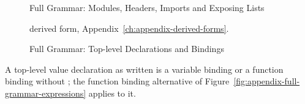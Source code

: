 \begin{figure}[tbp]
\centering
\begin{grammar}
\end{grammar}
\caption{Full Grammar: Modules, Headers, Imports and Exposing Lists}
\label{fig:appendix-full-grammar-modules}
\end{figure}

\begin{figure}[tbp]
\centering
\begin{grammar}
\end{grammar}
\medskip
{\small\fgderived{} derived form, Appendix~\ref{ch:appendix-derived-forms}.\par}
\caption{Full Grammar: Top-level Declarations and Bindings}
\label{fig:appendix-full-grammar-top-level}
\end{figure}

A top-level value declaration as written is a variable binding or a function
binding without ; the function binding alternative of
Figure~\ref{fig:appendix-full-grammar-expressions} applies to it.
